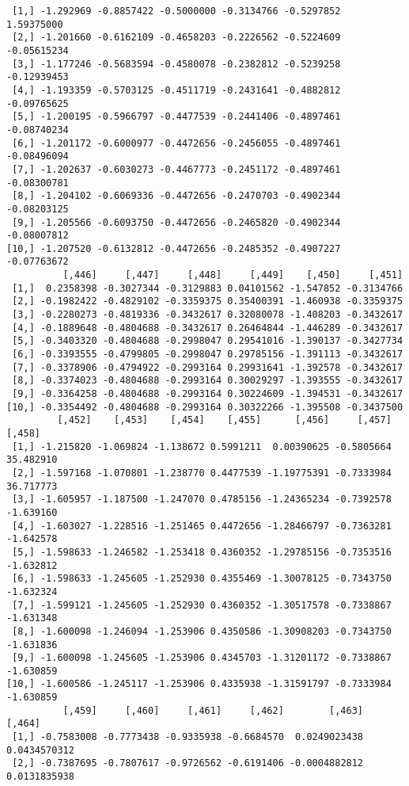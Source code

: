 \documentclass[
  letterpaper,
  DIV=11,
  numbers=noendperiod]{scrreprt}
\begin{document}
\begin{verbatim}
 [1,] -1.292969 -0.8857422 -0.5000000 -0.3134766 -0.5297852  1.59375000
 [2,] -1.201660 -0.6162109 -0.4658203 -0.2226562 -0.5224609 -0.05615234
 [3,] -1.177246 -0.5683594 -0.4580078 -0.2382812 -0.5239258 -0.12939453
 [4,] -1.193359 -0.5703125 -0.4511719 -0.2431641 -0.4882812 -0.09765625
 [5,] -1.200195 -0.5966797 -0.4477539 -0.2441406 -0.4897461 -0.08740234
 [6,] -1.201172 -0.6000977 -0.4472656 -0.2456055 -0.4897461 -0.08496094
 [7,] -1.202637 -0.6030273 -0.4467773 -0.2451172 -0.4897461 -0.08300781
 [8,] -1.204102 -0.6069336 -0.4472656 -0.2470703 -0.4902344 -0.08203125
 [9,] -1.205566 -0.6093750 -0.4472656 -0.2465820 -0.4902344 -0.08007812
[10,] -1.207520 -0.6132812 -0.4472656 -0.2485352 -0.4907227 -0.07763672
          [,446]     [,447]     [,448]     [,449]    [,450]     [,451]
 [1,]  0.2358398 -0.3027344 -0.3129883 0.04101562 -1.547852 -0.3134766
 [2,] -0.1982422 -0.4829102 -0.3359375 0.35400391 -1.460938 -0.3359375
 [3,] -0.2280273 -0.4819336 -0.3432617 0.32080078 -1.408203 -0.3432617
 [4,] -0.1889648 -0.4804688 -0.3432617 0.26464844 -1.446289 -0.3432617
 [5,] -0.3403320 -0.4804688 -0.2998047 0.29541016 -1.390137 -0.3427734
 [6,] -0.3393555 -0.4799805 -0.2998047 0.29785156 -1.391113 -0.3432617
 [7,] -0.3378906 -0.4794922 -0.2993164 0.29931641 -1.392578 -0.3432617
 [8,] -0.3374023 -0.4804688 -0.2993164 0.30029297 -1.393555 -0.3432617
 [9,] -0.3364258 -0.4804688 -0.2993164 0.30224609 -1.394531 -0.3432617
[10,] -0.3354492 -0.4804688 -0.2993164 0.30322266 -1.395508 -0.3437500
         [,452]    [,453]    [,454]    [,455]      [,456]     [,457]    [,458]
 [1,] -1.215820 -1.069824 -1.138672 0.5991211  0.00390625 -0.5805664 35.482910
 [2,] -1.597168 -1.070801 -1.238770 0.4477539 -1.19775391 -0.7333984 36.717773
 [3,] -1.605957 -1.187500 -1.247070 0.4785156 -1.24365234 -0.7392578 -1.639160
 [4,] -1.603027 -1.228516 -1.251465 0.4472656 -1.28466797 -0.7363281 -1.642578
 [5,] -1.598633 -1.246582 -1.253418 0.4360352 -1.29785156 -0.7353516 -1.632812
 [6,] -1.598633 -1.245605 -1.252930 0.4355469 -1.30078125 -0.7343750 -1.632324
 [7,] -1.599121 -1.245605 -1.252930 0.4360352 -1.30517578 -0.7338867 -1.631348
 [8,] -1.600098 -1.246094 -1.253906 0.4350586 -1.30908203 -0.7343750 -1.631836
 [9,] -1.600098 -1.245605 -1.253906 0.4345703 -1.31201172 -0.7338867 -1.630859
[10,] -1.600586 -1.245117 -1.253906 0.4335938 -1.31591797 -0.7333984 -1.630859
          [,459]     [,460]     [,461]     [,462]        [,463]        [,464]
 [1,] -0.7583008 -0.7773438 -0.9335938 -0.6684570  0.0249023438  0.0434570312
 [2,] -0.7387695 -0.7807617 -0.9726562 -0.6191406 -0.0004882812  0.0131835938

\end{verbatim}
\end{document}

